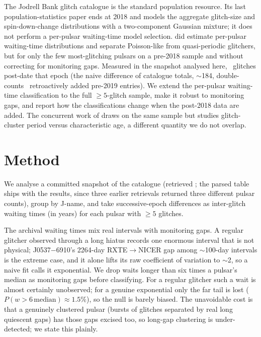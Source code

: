 \documentclass[twocolumn]{aastex631}
\begin{document}
The Jodrell Bank glitch catalogue \citep{espinoza2011,basu2022} is the standard population resource.
Its last population-statistics paper \citep{basu2022} ends at 2018 and models the aggregate
glitch-size and spin-down-change distributions with a two-component Gaussian mixture; it does not
perform a per-pulsar waiting-time model selection. \citet{howitt2018} did estimate per-pulsar
waiting-time distributions and separate Poisson-like from quasi-periodic glitchers, but for only the
few most-glitching pulsars on a pre-2018 sample and without correcting for monitoring gaps. Measured in the
snapshot analysed here, \gpRealNPostSplit\ glitches post-date that epoch (the naive difference
of catalogue totals, $\sim$184, double-counts \gpRealNRetroPre\ retroactively added pre-2019
entries). We extend the per-pulsar waiting-time classification to the full $\ge5$-glitch
sample, make it robust to monitoring gaps, and report how the classifications change when the
post-2018 data are added. The concurrent work of \citet{zhuzheng2025}
draws on the same sample but studies glitch-cluster period versus characteristic age, a
different quantity we do not overlap.

\section{Method}
\label{sec:method}
We analyse a committed snapshot of the catalogue (retrieved \gpRealRetrieved; the parsed
table ships with the results, since three earlier retrievals returned three different pulsar
counts), group by J-name, and take successive-epoch differences as inter-glitch waiting times
(in years) for each pulsar with $\ge5$ glitches.

The archival waiting times mix real intervals with monitoring gaps.
A regular glitcher observed through a long hiatus records one enormous interval that is not physical;
J0537$-$6910's 2264-day RXTE$\to$NICER gap among $\sim$100-day intervals is the extreme case, and it
alone lifts its raw coefficient of variation to $\sim$2, so a naive fit calls it exponential. We drop
waits longer than six times a pulsar's median as monitoring gaps before classifying. For a regular
glitcher such a wait is almost certainly unobserved; for a genuine exponential only the far tail is
lost ($P(w>6\,\mathrm{median})\approx1.5\%$), so the null is barely biased. The unavoidable cost is
that a genuinely clustered pulsar (bursts of glitches separated by real long quiescent gaps)
has those gaps excised too, so long-gap clustering is under-detected; we state this plainly.
\end{document}
